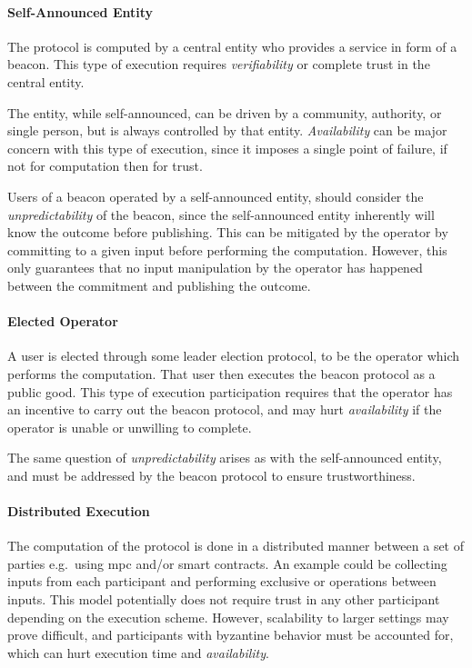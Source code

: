 \paragraph{Self-Announced Entity}
    The protocol is computed by a central entity who provides a service in form of a beacon.
    This type of execution requires \emph{verifiability} or complete trust in the central entity.

    The entity, while self-announced, can be driven by a community, authority, or single person, but is always controlled by that entity.
    \emph{Availability} can be major concern with this type of execution, since it imposes a single point of failure, if not for computation then for trust.

    Users of a beacon operated by a self-announced entity, should consider the \emph{unpredictability} of the beacon, since the self-announced entity inherently will know the outcome before publishing.
    This can be mitigated by the operator by committing to a given input before performing the computation.
    However, this only guarantees that no input manipulation by the operator has happened between the commitment and publishing the outcome.

\paragraph{Elected Operator}
    A user is elected through some leader election protocol, to be the operator which performs the computation.
    That user then executes the beacon protocol as a public good.
    This type of execution participation requires that the operator has an incentive to carry out the beacon protocol, and may hurt \emph{availability} if the operator is unable or unwilling to complete.

    The same question of \emph{unpredictability} arises as with the self-announced entity, and must be addressed by the beacon protocol to ensure trustworthiness.

\paragraph{Distributed Execution}
    The computation of the protocol is done in a distributed manner between a set of parties e.g.\ using \gls{mpc} and/or smart contracts.
    An example could be collecting inputs from each participant and performing exclusive or operations between inputs.
    This model potentially does not require trust in any other participant depending on the execution scheme.
    However, scalability to larger settings may prove difficult, and participants with byzantine behavior must be accounted for, which can hurt execution time and \emph{availability}.


